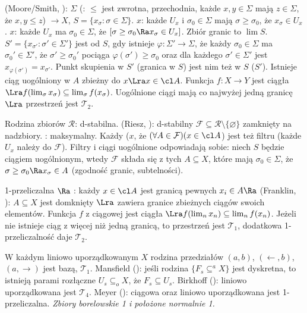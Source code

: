   (Moore/Smith, ): $\Sigma$ (: $\le$ jest zwrotna, przechodnia, każde $x, y \in \Sigma$ mają $z \in \Sigma$, że $x, y \le z$) $\to X$, $S = \{x_\sigma : \sigma \in \Sigma\}$.
 $x$: każde $U_x$ i $\sigma_0 \in \Sigma$ mają $\sigma \ge \sigma_0$, że $x_\sigma \in U_x$.
 $x$: każde $U_x$ ma $\sigma_0 \in \Sigma$, że $[\sigma \ge \sigma_0 \Ra x_\sigma \in U_x]$.
Zbiór granic to $\lim S$.
$S' = \{x_{\sigma'} : \sigma' \in \Sigma'\}$ jest  od $S$, gdy istnieje $\varphi \colon \Sigma' \to \Sigma$, że każdy $\sigma_0 \in \Sigma$ ma $\sigma_0' \in \Sigma'$, że $\sigma' \ge \sigma_0'$ pociąga $\varphi(\sigma') \ge \sigma_0$ oraz dla każdego $\sigma' \in \Sigma'$ jest $x_{\varphi(\sigma')} = x_{\sigma'}$.
Punkt skupienia w $S'$ (granica w $S$) jest nim też w $S$ ($S'$).
Istnieje ciąg uogólniony w $A$ zbieżny do $x \Lra x \in \cl A$.
Funkcja $f \colon X \to Y$ jest ciągła $\Lra f (\lim_\sigma x_\sigma) \subseteq \lim_\sigma f(x_\sigma)$.
Uogólnione ciągi mają co najwyżej jedną granicę $\Lra$ przestrzeń jest $\mathcal T_2$.

Rodzina zbiorów $\mathcal R$: d-stabilna.
 (Riesz, ): d-stabilny $\mathcal F \subseteq \mathcal R \setminus \{\varnothing\}$ zamknięty na nadzbiory.
: maksymalny.
Każdy  ($x$, że $(\forall A \in \mathcal F)(x \in \cl A$) jest też  filtru (każde $U_x$ należy do $\mathcal F$).
Filtry i ciągi uogólnione odpowiadają sobie: niech $S$ będzie ciągiem uogólnionym, wtedy $\mathcal F$ składa się z tych $A \subseteq X$, które mają $\sigma_0 \in \Sigma$, że $\sigma \ge \sigma_0 \Ra x_\sigma \in A$ (zgodność granic, subtelności).

1-przeliczalna $\Ra$ : każdy $x \in \cl A$ jest granicą pewnych $x_i \in A \Ra$  (Franklin, ): $A \subseteq X$ jest domknięty $\Lra$ zawiera granice zbieżnych ciągów swoich elementów.
Funkcja $f$ z ciągowej jest ciągła $\Lra f(\lim_n x_n) \subseteq \lim_n f(x_n)$.
Jeżeli nie istnieje ciąg z więcej niż jedną granicą, to przestrzeń jest $\mathcal T_1$, dodatkowa 1-przeliczalność daje $\mathcal T_2$.

W  każdym liniowo uporządkowanym $X$ rodzina przedziałów $(a,b)$, $(\leftarrow, b)$, $(a, \rightarrow)$ jest bazą, $\mathcal T_1$.
Mansfield (): jeśli rodzina $\{F_s \subseteq^a X\}$ jest dyskretna, to istnieją parami rozłączne $U_s \subseteq_o X$, że $F_s \subseteq U_s$.
Birkhoff (): liniowo uporządkowana jest $\mathcal T_4$.
Meyer (): ciągowa oraz liniowo uporządkowana jest 1-przeliczalna.
\emph{Zbiory borelowskie 1 i położone normalnie 1.}

